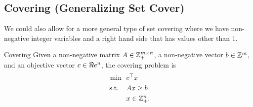 




\subsection{Covering (Generalizing Set Cover)}
We could also allow for a more general type of set covering where we have non-negative integer variables and a right hand side that has values other than $1$.
\begin{general}{Covering}{\npcomplete}
\label{general:covering}
Given a non-negative matrix $A \in \mathbb{Z}_+^{m \times n}$, a non-negative vector $b \in \mathbb{Z}^m$, and an objective vector $c \in \Re e^n$, the covering problem is
\begin{equation}
\begin{split}
\min \ \ & c^\top x\\
\mbox{ s.t. } \ \ & Ax \geq b \\
& x \in\mathbb{Z}^n_+.
\end{split}
\end{equation}
\end{general}






